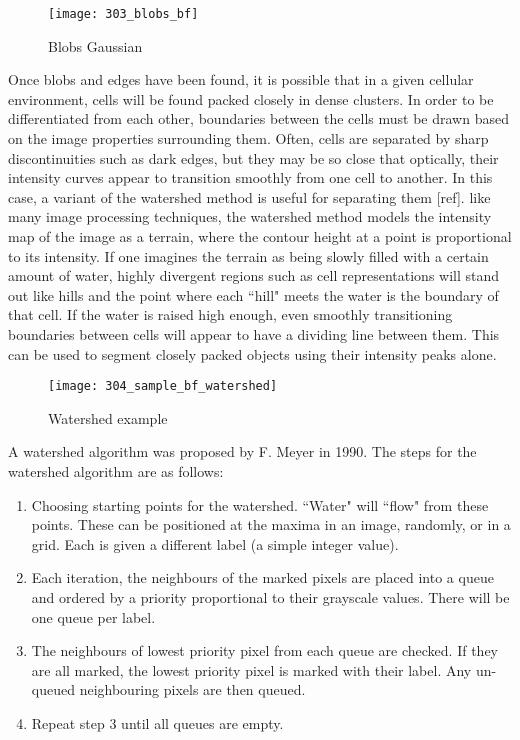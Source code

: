 \begin{figure}[p]
 \centering
 \texttt{[image: 303\_blobs\_bf]}
 \caption{
 	Blobs Gaussian
 }
 \label{fig:blob}
\end{figure}

Once blobs and edges have been found, it is possible that in a given cellular environment, cells will be found packed closely in dense clusters. In order to be differentiated from each other, boundaries between the cells must be drawn based on the image properties surrounding them. Often, cells are separated by sharp discontinuities such as dark edges, but they may be so close that optically, their intensity curves appear to transition smoothly from one cell to another. In this case, a variant of the watershed method is useful for separating them [ref]. like many image processing techniques, the watershed method models the intensity map of the image as a terrain, where the contour height at a point is proportional to its intensity. If one imagines the terrain as being slowly filled with a certain amount of water, highly divergent regions such as cell representations will stand out like hills and the point where each ``hill" meets the water is the boundary of that cell. If the water is raised high enough, even smoothly transitioning boundaries between cells will appear to have a dividing line between them. This can be used to segment closely packed objects using their intensity peaks alone.

\begin{figure}[p]
 \centering
 \texttt{[image: 304\_sample\_bf\_watershed]}
 \caption{
 	Watershed example
 }
 \label{fig:watershed}
\end{figure}

A watershed algorithm was proposed by F. Meyer in 1990. The steps for the watershed algorithm are as follows:
\begin{enumerate}
	\item Choosing starting points for the watershed. ``Water" will ``flow" from these points. These can be positioned at the maxima in an image, randomly, or in a grid. Each is given a different label (a simple integer value).
	\item Each iteration, the neighbours of the marked pixels are placed into a queue and ordered by a priority proportional to their grayscale values. There will be one queue per label.
	\item The neighbours of lowest priority pixel from each queue are checked. If they are all marked, the lowest priority pixel is marked with their label. Any un-queued neighbouring pixels are then queued.
	\item Repeat step 3 until all queues are empty.
\end{enumerate}

